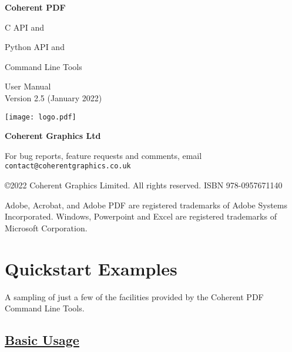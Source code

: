\documentclass{book}
\newcommand{\smallgap}{\bigskip}
\begin{document}
\frontmatter
\pagestyle{empty}


\begin{flushright}


{\sffamily \bfseries \Huge Coherent PDF

\vspace{2mm}
\begin{cpdflib}
C API and 
\end{cpdflib}
\begin{pycpdflib}
Python API and
\end{pycpdflib}
Command Line Tools}

\vspace{12mm}

{\Huge User Manual}\\
Version 2.5 (January 2022)

\vspace{25mm}

\vfill
\ifdefined\HCode
\else
\texttt{[image: logo.pdf]}
\fi


\vspace{2mm}
{\sffamily \bfseries \LARGE Coherent Graphics Ltd}

\end{flushright}

\clearpage

\pagestyle{empty}
\noindent For bug reports, feature requests and comments, email\\ \texttt{contact@coherentgraphics.co.uk}

\vspace*{\fill}
\noindent\copyright 2022 Coherent Graphics Limited. All rights reserved. ISBN 978-0957671140

\smallgap 
\noindent Adobe, Acrobat, and Adobe PDF are
registered trademarks of Adobe Systems Incorporated. Windows, Powerpoint and
Excel are registered trademarks of Microsoft Corporation.

\cleardoublepage

\pagestyle{plain}
\chapter*{Quickstart Examples}

A sampling of just a few of the facilities provided by the Coherent PDF Command Line Tools.

\section*{\hyperref[chap:1]{Basic Usage}}
\end{document}
